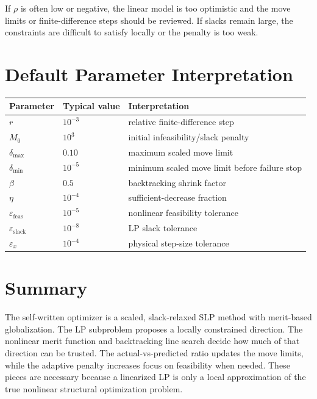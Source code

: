 \documentclass[11pt,a4paper]{article}
\begin{document}
If \(\rho\) is often low or negative, the linear model is too optimistic and the
move limits or finite-difference steps should be reviewed. If slacks remain
large, the constraints are difficult to satisfy locally or the penalty is too
weak.

\section{Default Parameter Interpretation}

\begin{table}[h]
\centering
\begin{tabular}{lll}
\toprule
Parameter & Typical value & Interpretation \\
\midrule
\(r\) & \(10^{-3}\) & relative finite-difference step \\
\(M_0\) & \(10^3\) & initial infeasibility/slack penalty \\
\(\delta_{\max}\) & \(0.10\) & maximum scaled move limit \\
\(\delta_{\min}\) & \(10^{-5}\) & minimum scaled move limit before failure stop \\
\(\beta\) & \(0.5\) & backtracking shrink factor \\
\(\eta\) & \(10^{-4}\) & sufficient-decrease fraction \\
\(\varepsilon_{\text{feas}}\) & \(10^{-5}\) & nonlinear feasibility tolerance \\
\(\varepsilon_{\text{slack}}\) & \(10^{-8}\) & LP slack tolerance \\
\(\varepsilon_x\) & \(10^{-4}\) & physical step-size tolerance \\
\bottomrule
\end{tabular}
\end{table}

\section{Summary}

The self-written optimizer is a scaled, slack-relaxed SLP method with
merit-based globalization. The LP subproblem proposes a locally constrained
direction. The nonlinear merit function and backtracking line search decide how
much of that direction can be trusted. The actual-vs-predicted ratio updates the
move limits, while the adaptive penalty increases focus on feasibility when
needed. These pieces are necessary because a linearized LP is only a local
approximation of the true nonlinear structural optimization problem.
\end{document}

